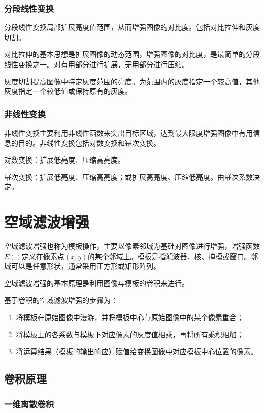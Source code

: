 \documentclass[cn, blue, normal, 12pt]{elegantnote}
\begin{document}
{\subsubsection{分段线性变换}

分段线性变换局部扩展亮度值范围，从而增强图像的对比度。包括对比拉伸和灰度切割。

对比拉伸的基本思想是扩展图像的动态范围，增强图像的对比度，是最简单的分段线性变换之一。对有用部分进行扩展，无用部分进行压缩。

灰度切割提高图像中特定灰度范围的亮度。为范围内的灰度指定一个较高值，其他灰度指定一个较低值或保持原有的灰度。

\subsubsection{非线性变换}

非线性变换主要利用非线性函数来突出目标区域，达到最大限度增强图像中有用信息的目的。非线性变换包括对数变换和幂次变换。

对数变换：扩展低亮度、压缩高亮度。

幂次变换：扩展低亮度、压缩高亮度；或扩展高亮度、压缩低亮度。由幂次系数决定。

\section{空域滤波增强}

空域滤波增强也称为模板操作，主要以像素邻域为基础对图像进行增强，增强函数$E()$定义在像素点$(x,y)$的某个邻域上。模板是指滤波器、核、掩模或窗口。邻域可以是任意形状，通常采用正方形或矩形阵列。

空域滤波增强的基本原理是利用图像与模板的卷积来进行。

基于卷积的空域滤波增强的步骤为：

\begin{enumerate}
    \item 将模板在原始图像中漫游，并将模板中心与原始图像中的某个像素重合；
    \item 将模板上的各系数与模板下对应像素的灰度值相乘，再将所有乘积相加；
    \item 将运算结果（模板的输出响应）赋值给变换图像中对应模板中心位置的像素。
\end{enumerate}

\subsection{卷积原理}

\subsubsection{一维离散卷积}

}
\end{document}
